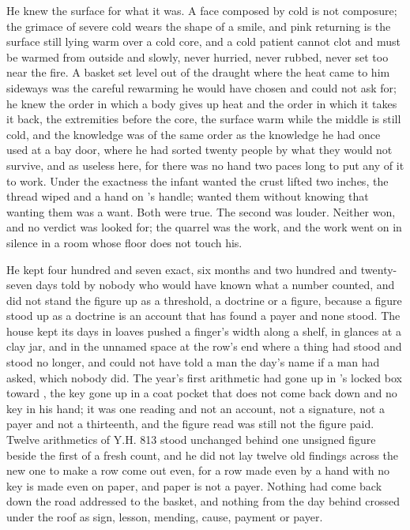 He knew the surface for what it was. A face composed by cold is not composure; the grimace of severe cold wears the shape of a smile, and pink returning is the surface still lying warm over a cold core, and a cold patient cannot clot and must be warmed from outside and slowly, never hurried, never rubbed, never set too near the fire. A basket set level out of the draught where the heat came to him sideways was the careful rewarming he would have chosen and could not ask for; he knew the order in which a body gives up heat and the order in which it takes it back, the extremities before the core, the surface warm while the middle is still cold, and the knowledge was of the same order as the knowledge he had once used at a bay door, where he had sorted twenty people by what they would not survive, and as useless here, for there was no hand two paces long to put any of it to work. Under the exactness the infant wanted the crust lifted two inches, the thread wiped and a hand on 's handle; wanted them without knowing that wanting them was a want. Both were true. The second was louder. Neither won, and no verdict was looked for; the quarrel was the work, and the work went on in silence in a room whose floor does not touch his.

He kept four hundred and seven exact, six months and two hundred and twenty-seven days told by nobody who would have known what a number counted, and did not stand the figure up as a threshold, a doctrine or a figure, because a figure stood up as a doctrine is an account that has found a payer and none stood. The house kept its days in loaves pushed a finger's width along a shelf, in glances at a clay jar, and in the unnamed space at the row's end where a thing had stood and stood no longer, and could not have told a man the day's name if a man had asked, which nobody did. The year's first arithmetic had gone up  in 's locked box toward , the key gone up in a coat pocket that does not come back down and no key in his hand; it was one reading and not an account, not a signature, not a payer and not a thirteenth, and the figure read was still not the figure paid. Twelve arithmetics of Y.H. 813 stood unchanged behind one unsigned figure beside the first of a fresh count, and he did not lay twelve old findings across the new one to make a row come out even, for a row made even by a hand with no key is made even on paper, and paper is not a payer. Nothing had come back down the road addressed to the basket, and nothing from the day behind crossed under the roof as sign, lesson, mending, cause, payment or payer.

